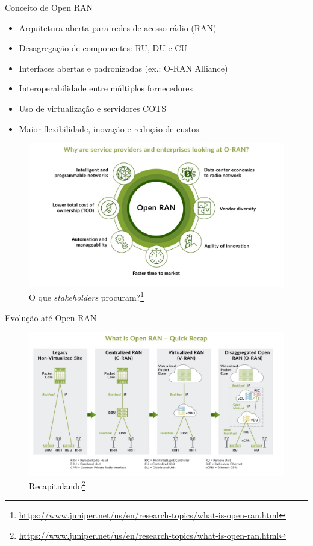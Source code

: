 \begin{frame}{Conceito de Open RAN}
\begin{itemize}
  \item Arquitetura aberta para redes de acesso rádio (RAN)
  \item Desagregação de componentes: RU, DU e CU
  \item Interfaces abertas e padronizadas (ex.: O-RAN Alliance)
  \item Interoperabilidade entre múltiplos fornecedores
  \item Uso de virtualização e servidores COTS
  \item Maior flexibilidade, inovação e redução de custos
\end{itemize}
\vspace{-0.2cm}
\begin{figure}
    \centering
    \includegraphics[width=0.6\linewidth]{figs/what-is-O-RAN.jpeg}
    \caption{O que \textit{stakeholders} procuram?\footnote{\href{https://www.juniper.net/us/en/research-topics/what-is-open-ran.html}{https://www.juniper.net/us/en/research-topics/what-is-open-ran.html}}}
\end{figure}
\end{frame}

\begin{frame}{Evolução até Open RAN}
\begin{figure}
    \centering
    \includegraphics[width=\linewidth]{figs/what-is-O-RAN-quick-recap.jpeg}
    \caption{Recapitulando\footnote{\href{https://www.juniper.net/us/en/research-topics/what-is-open-ran.html}{https://www.juniper.net/us/en/research-topics/what-is-open-ran.html}}}
\end{figure}
\end{frame}

